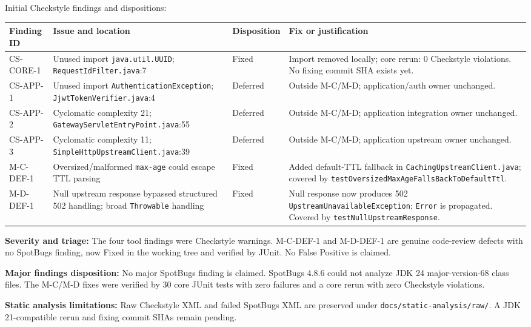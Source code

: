 \documentclass[11pt,a4paper]{article}
\newcommand{\evidence}[1]{\texttt{#1}}
\begin{document}
Initial Checkstyle findings and dispositions:
\begin{longtable}{L{1.7cm} L{4.0cm} L{2.2cm} L{4.2cm}}\toprule
\textbf{Finding ID} & \textbf{Issue and location} & \textbf{Disposition} & \textbf{Fix or justification}\\\midrule\endhead
CS-CORE-1 & Unused import \texttt{java.util.UUID}; \texttt{RequestIdFilter.java}:7 & Fixed & Import removed locally; core rerun: 0 Checkstyle violations. No fixing commit SHA exists yet.\\
CS-APP-1 & Unused import \texttt{AuthenticationException}; \texttt{JjwtTokenVerifier.java}:4 & Deferred & Outside M-C/M-D; application/auth owner unchanged.\\
CS-APP-2 & Cyclomatic complexity 21; \texttt{GatewayServletEntryPoint.java}:55 & Deferred & Outside M-C/M-D; application integration owner unchanged.\\
CS-APP-3 & Cyclomatic complexity 11; \texttt{SimpleHttpUpstreamClient.java}:39 & Deferred & Outside M-C/M-D; application upstream owner unchanged.\\
M-C-DEF-1 & Oversized/malformed \texttt{max-age} could escape TTL parsing & Fixed & Added default-TTL fallback in \evidence{CachingUpstreamClient.java}; covered by \texttt{testOversizedMaxAgeFallsBackToDefaultTtl}.\\
M-D-DEF-1 & Null upstream response bypassed structured 502 handling; broad \texttt{Throwable} handling & Fixed & Null response now produces 502 \texttt{UpstreamUnavailableException}; \texttt{Error} is propagated. Covered by \texttt{testNullUpstreamResponse}.\\
\bottomrule\end{longtable}

\textbf{Severity and triage:} The four tool findings were Checkstyle warnings. M-C-DEF-1 and M-D-DEF-1 are genuine code-review defects with no SpotBugs finding, now Fixed in the working tree and verified by JUnit. No False Positive is claimed.\par
\textbf{Major findings disposition:} No major SpotBugs finding is claimed. SpotBugs 4.8.6 could not analyze JDK 24 major-version-68 class files. The M-C/M-D fixes were verified by 30 core JUnit tests with zero failures and a core rerun with zero Checkstyle violations.\par
\textbf{Static analysis limitations:} Raw Checkstyle XML and failed SpotBugs XML are preserved under \evidence{docs/static-analysis/raw/}. A JDK 21-compatible rerun and fixing commit SHAs remain pending.
\end{document}
